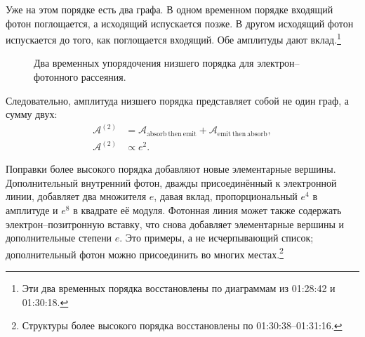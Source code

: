 Уже на этом порядке есть два графа. В одном временном порядке входящий фотон поглощается, а исходящий испускается позже. В другом исходящий фотон испускается до того, как поглощается входящий. Обе амплитуды дают вклад.\footnote{Эти два временных порядка восстановлены по диаграммам из 01:28:42 и 01:30:18.}

\begin{figure}[htbp]
\centering
{}
\caption{Два временных упорядочения низшего порядка для электрон--фотонного рассеяния.}
\end{figure}

Следовательно, амплитуда низшего порядка представляет собой не один граф, а сумму двух:
\begin{equation}
\begin{aligned}
\mathcal{A}^{(2)}
&=
\mathcal{A}_{\mathrm{absorb\ then\ emit}}
+\mathcal{A}_{\mathrm{emit\ then\ absorb}},\\
\mathcal{A}^{(2)}&\propto e^2.
\end{aligned}
\end{equation}

Поправки более высокого порядка добавляют новые элементарные вершины. Дополнительный внутренний фотон, дважды присоединённый к электронной линии, добавляет два множителя \(e\), давая вклад, пропорциональный \(e^4\) в амплитуде и \(e^8\) в квадрате её модуля. Фотонная линия может также содержать электрон--позитронную вставку, что снова добавляет элементарные вершины и дополнительные степени \(e\). Это примеры, а не исчерпывающий список; дополнительный фотон можно присоединить во многих местах.\footnote{Структуры более высокого порядка восстановлены по 01:30:38--01:31:16.}

